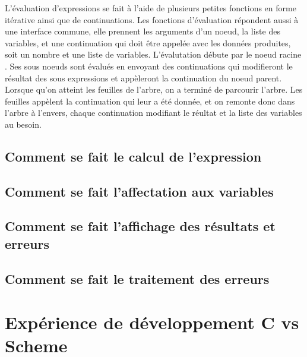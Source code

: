 \documentclass[a4paper,12pt,french]{article}
\begin{document}
        L'évaluation d'expressions se fait à l'aide de plusieurs petites fonctions en forme itérative ainsi que de continuations. Les fonctions d'évaluation répondent aussi à une interface commune, elle prennent les arguments d'un noeud, la liste des variables, et une continuation qui doit être appelée avec les données produites, soit un nombre et une liste de variables. L'évalutation débute par le noeud \og racine \fg{}. Ses sous noeuds sont évalués en envoyant des continuations qui modifieront le résultat des sous expressions et appèleront la continuation du noeud parent. Lorsque qu'on atteint les feuilles de l'arbre, on a terminé de parcourir l'arbre. Les feuilles appèlent la continuation qui leur a été donnée, et on remonte donc dans l'arbre à l'envers, chaque continuation modifiant le réultat et la liste des variables au besoin.
        \subsection{Comment se fait le calcul de l'expression}
	\subsection{Comment se fait l'affectation aux variables}
	\subsection{Comment se fait l'affichage des résultats et erreurs}
	\subsection{Comment se fait le traitement des erreurs}
\section{Expérience de développement C vs Scheme}
\end{document}

